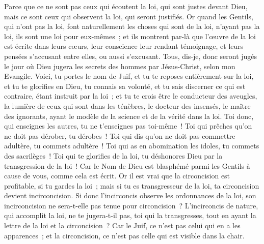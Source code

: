 \begin{multicols}{2}
Parce que ce ne sont pas ceux qui écoutent la loi, qui sont justes devant Dieu, mais ce sont ceux qui observent la loi, qui seront justifiés.
Or quand les Gentils, qui n'ont pas la loi, font naturellement les choses qui sont de la loi, n'ayant pas la loi, ils sont une loi pour eux-mêmes~;
et ils montrent par-là que l'œuvre de la loi est écrite dans leurs cœurs, leur conscience leur rendant témoignage, et leurs pensées s'accusant entre elles, ou aussi s'excusant.
Tous, dis-je, donc seront jugés le jour où Dieu jugera les secrets des hommes par Jésus-Christ, selon mon Evangile.
Voici, tu portes le nom de Juif, et tu te reposes entièrement sur la loi, et tu te glorifies en Dieu,
tu connais sa volonté, et tu sais discerner ce qui est contraire, étant instruit par la loi~; 
et tu te crois être le conducteur des aveugles, la lumière de ceux qui sont dans les ténèbres,
le docteur des insensés, le maître des ignorants, ayant le modèle de la science et de la vérité dans la loi.
Toi donc, qui enseignes les autres, tu ne t'enseignes pas toi-même~! Toi qui prêches qu'on ne doit pas dérober, tu dérobes~!
Toi qui dis qu'on ne doit pas commettre adultère, tu commets adultère~! Toi qui as en abomination les idoles, tu commets des sacrilèges~!
Toi qui te glorifies de la loi, tu déshonores Dieu par la transgression de la loi~!
Car le Nom de Dieu est blasphémé parmi les Gentils à cause de vous, comme cela est écrit.
Or il est vrai que la circoncision est profitable, si tu gardes la loi~; mais si tu es transgresseur de la loi, ta circoncision devient incirconcision.
Si donc l'incirconcis observe les ordonnances de la loi, son incirconcision ne sera-t-elle pas tenue pour circoncision~?
L'incirconcis de nature, qui accomplit la loi, ne te jugera-t-il pas, toi qui la transgresses, tout en ayant la lettre de la loi et la circoncision~?
Car le Juif, ce n'est pas celui qui en a les apparences~; et la circoncision, ce n'est pas celle qui est visible dans la chair.

\end{multicols}
